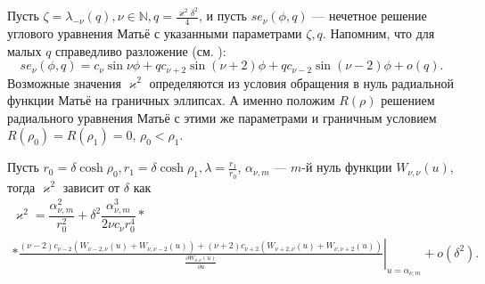 Пусть $\zeta = \lambda_{-\nu}(q), \nu \in \mathbb{N}, q=\frac{\varkappa^2 \delta^2}{4}$, и пусть $se_\nu(\phi, q)$ --- нечетное решение углового уравнения Матьё с указанными параметрами $\zeta, q$.
Напомним, что для малых $q$ справедливо разложение (см. \cite[\S\ 2.2, с.~122--124]{wref12}):
$$se_\nu(\phi, q) = c_\nu \sin{\nu \phi} + q c_{\nu+2} \sin{(\nu+2) \phi} +q c_{\nu-2} \sin{(\nu-2) \phi} + o(q).$$ 
Возможные значения $\varkappa^2$ определяются из условия обращения в нуль радиальной функции Матьё на граничных эллипсах. А именно положим $R(\rho)$ решением радиального уравнения Матьё с этими же параметрами и граничным условием $R(\rho_0)=R(\rho_1)=0$, $\rho_0 < \rho_1$.
\begin{lemma}
Пусть $r_0 = \delta\cosh{\rho_0}, r_1 = \delta\cosh{\rho_1}, \lambda = \frac{r_1}{r_0}$, $\alpha_{\nu, m}$ --- $m$-й нуль функции $W_{\nu, \nu}(u)$, тогда $\varkappa^2$ зависит от $\delta$ как
{\small
\begin{multline*}
\varkappa^2 = \dfrac{\alpha_{\nu, m}^2}{r_0^2} + \delta^2 \dfrac{\alpha_{\nu, m}^3}{2 \nu c_\nu r_0^4} * \\ * \left. \frac{
	(\nu-2) c_{\nu-2}
	\left(
	W_{\nu-2, \nu}(u) + W_{\nu, \nu-2}(u)
	\right)+ 
    (\nu+2) c_{\nu+2}
	\left(
	W_{\nu+2, \nu}(u) + W_{\nu, \nu+2}(u)
	\right)
}{ \frac{\partial W_{\nu,\nu}(u)}{\partial u} }\right|_{u=\alpha_{\nu, m}} + o(\delta^2).
\end{multline*}
}
\label{th:ringLemma2}
\end{lemma}

